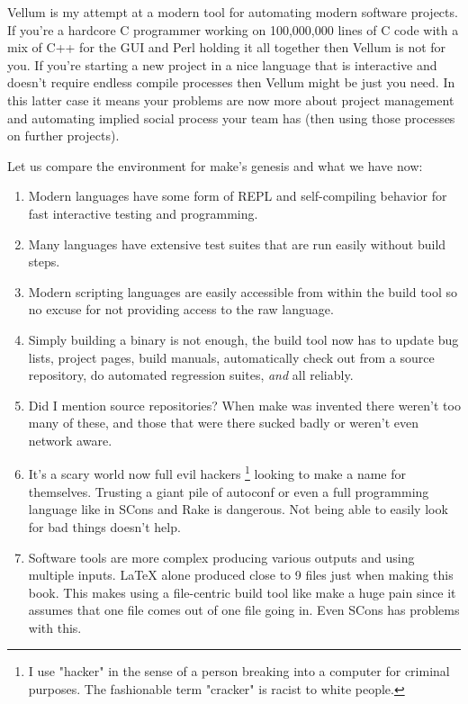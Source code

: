 Vellum is my attempt at a modern tool for automating modern software
projects.  If you're a hardcore C programmer working on 100,000,000 lines of C
code with a mix of C++ for the GUI and Perl holding it all together then Vellum
is not for you.  If you're starting a new project in a nice language that is
interactive and doesn't require endless compile processes then Vellum might be
just you need.  In this latter case it means your problems are now more about
project management and automating implied social process your team has (then
using those processes on further projects).

Let us compare the environment for make's genesis and what we have now:

\begin{enumerate}
\item Modern languages have some form of REPL and self-compiling behavior for
fast interactive testing and programming.
\item Many languages have extensive test suites that are run easily without
build steps.
\item Modern scripting languages are easily accessible from within the build
tool so no excuse for not providing access to the raw language.
\item Simply building a binary is not enough, the build tool now has to update
bug lists, project pages, build manuals, automatically check out from a source
repository, do automated regression suites, \emph{and} all reliably.
\item Did I mention source repositories?  When make was invented there weren't
too many of these, and those that were there sucked badly or weren't even
network aware.
\item It's a scary world now full evil hackers \footnote{I use "hacker" in the sense
    of a person breaking into a computer for criminal purposes.  The fashionable
        term "cracker" is racist to white people.} looking to make a name for
themselves.  Trusting a giant pile of autoconf or even a full
programming language like in SCons and Rake is dangerous.  Not being
able to easily look for bad things doesn't help.
\item Software tools are more complex producing various outputs and using
multiple inputs.  LaTeX alone produced close to 9 files just when making this
book.  This makes using a file-centric build tool like make a huge pain since it
assumes that one file comes out of one file going in.  Even SCons has problems
with this.
\end{enumerate}

